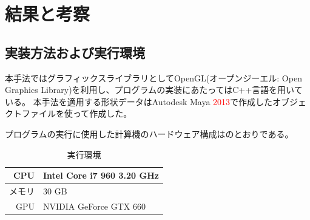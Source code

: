 \chapter{結果と考察}
\label{CResult}


\section{実装方法および実行環境}
\label{SEnvironment}

本手法ではグラフィックスライブラリとしてOpenGL(オープンジーエル: Open Graphics Library)を利用し、プログラムの実装にあたってはC++言語を用いている。
本手法を適用する形状データはAutodesk Maya \textcolor{red}{2013}で作成したオブジェクトファイルを使って作成した。

プログラムの実行に使用した計算機のハードウェア構成はのとおりである。

\begin{table}
\centering
\caption{実行環境 \label{tab:experiment-hadrware}}
\begin{tabular}{r|l}
\hline
CPU & Intel Core i7 960 3.20 GHz \\ \hline
メモリ & 30 GB \\ \hline
GPU & NVIDIA GeForce GTX 660 \\ \hline
\end{tabular}
\end{table}

